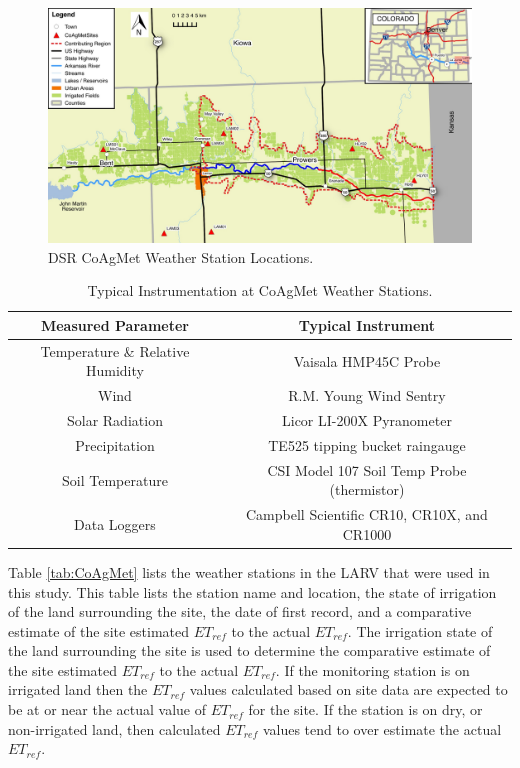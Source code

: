 	\begin{landscape}
	\begin{figure}[htbp]
		\includegraphics[scale=1]{Figures/Map/DSRCoAgMet}
		\caption[DSR CoAgMet Weather Station Locations.]{DSR CoAgMet Weather Station Locations.}
		\label{map:DSRCoAgMetLocations}	
	\end{figure}
	\end{landscape}
 
\begin{table}[htbp]
\centering
\caption[Typical Instrumentation at CoAgMet Weather Stations.]{Typical Instrumentation at CoAgMet Weather Stations.}
\label{tab:CoAgMetInstruments}
\begin{tabular}{c c}
	\toprule
	       Measured Parameter        & Typical Instrument                          \\ \toprule
	Temperature \& Relative Humidity & Vaisala HMP45C Probe                        \\
	              Wind               & R.M. Young Wind Sentry                      \\
	        Solar Radiation          & Licor LI-200X Pyranometer                   \\
	         Precipitation           & TE525 tipping bucket raingauge              \\
	        Soil Temperature         & CSI Model 107 Soil Temp Probe (thermistor)  \\
	          Data Loggers           & Campbell Scientific CR10, CR10X, and CR1000 \\ \bottomrule
\end{tabular}
\end{table}

Table \ref{tab:CoAgMet} lists the weather stations in the LARV that were used in this study.  This table lists the station name and location, the state of irrigation of the land surrounding the site, the date of first record, and a comparative estimate of the site estimated $ET_{ref}$ to the actual $ET_{ref}$.  The irrigation state of the land surrounding the site is used to determine the comparative estimate of the site estimated $ET_{ref}$ to the actual  $ET_{ref}$.  If the monitoring station is on irrigated land then the $ET_{ref}$ values calculated based on site data are expected to be at or near the actual value of $ET_{ref}$ for the site.  If the station is on dry, or non-irrigated land, then calculated $ET_{ref}$ values tend to over estimate the actual $ET_{ref}$.

